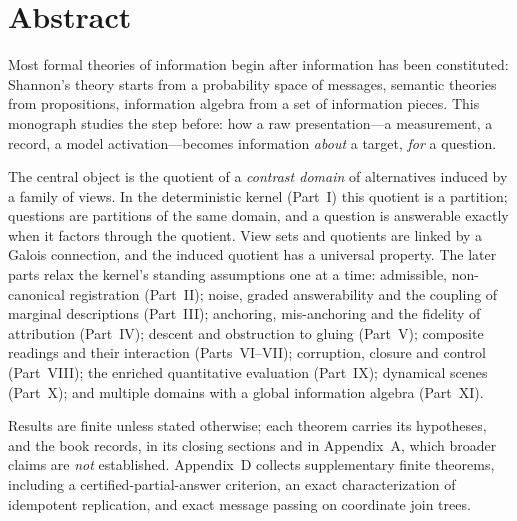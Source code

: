 \chapter*{Abstract}
Most formal theories of information begin after information has been constituted: Shannon's theory starts from a probability space of messages, semantic theories from propositions, information algebra from a set of information pieces. This monograph studies the step before: how a raw presentation---a measurement, a record, a model activation---becomes information \emph{about} a target, \emph{for} a question.

The central object is the quotient of a \emph{contrast domain} of alternatives induced by a family of views. In the deterministic kernel (Part~I) this quotient is a partition; questions are partitions of the same domain, and a question is answerable exactly when it factors through the quotient. View sets and quotients are linked by a Galois connection, and the induced quotient has a universal property. The later parts relax the kernel's standing assumptions one at a time: admissible, non-canonical registration (Part~II); noise, graded answerability and the coupling of marginal descriptions (Part~III); anchoring, mis-anchoring and the fidelity of attribution (Part~IV); descent and obstruction to gluing (Part~V); composite readings and their interaction (Parts~VI--VII); corruption, closure and control (Part~VIII); the enriched quantitative evaluation (Part~IX); dynamical scenes (Part~X); and multiple domains with a global information algebra (Part~XI).

Results are finite unless stated otherwise; each theorem carries its hypotheses, and the book records, in its closing sections and in Appendix~A, which broader claims are \emph{not} established. Appendix~D collects supplementary finite theorems, including a certified-partial-answer criterion, an exact characterization of idempotent replication, and exact message passing on coordinate join trees.
\cleardoublepage
